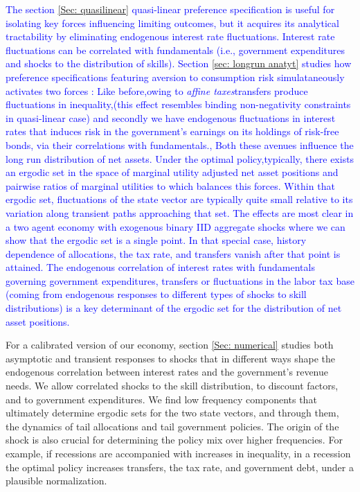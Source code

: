 \documentclass[thmsb,11pt]{article}
\begin{document}
\textcolor{blue}{The section \ref{Sec: quasilinear} quasi-linear preference specification is useful for isolating key forces influencing
limiting outcomes, but it acquires its analytical tractability by eliminating endogenous interest rate fluctuations.
Interest rate fluctuations can be correlated with fundamentals (i.e., government expenditures and shocks to the distribution
of skills). Section \ref{sec: longrun anatyt} studies how preference specifications
featuring aversion to consumption risk simulataneously activates two forces : Like before,owing to \emph{affine taxes}transfers produce fluctuations in inequality,(this effect resembles binding non-negativity constraints in quasi-linear case) and secondly we have endogenous fluctuations in interest rates that induces risk in the government's earnings on its holdings of risk-free bonds, via their correlations with fundamentals., Both these avenues influence the long run distribution of net assets. Under the optimal policy,typically, there exists an ergodic set in the space of marginal utility adjusted net asset positions and pairwise ratios of marginal utilities to which balances this forces. Within that ergodic set, fluctuations of the state vector are typically quite small relative to its variation along transient paths approaching that set. The effects are most clear in a two agent economy with exogenous binary IID aggregate shocks where we can show that the ergodic set is a single point. In that special case, history dependence
of allocations, the tax rate, and transfers vanish after that point is attained. The endogenous correlation of interest rates with fundamentals governing government
expenditures, transfers or fluctuations in the labor tax base (coming from endogenous responses to different types of shocks to skill distributions) is a key determinant of the ergodic set for the distribution of net asset positions.}

 For a calibrated version of our economy, section \ref{Sec: numerical} studies both asymptotic and transient responses to shocks
 that    in different ways shape the endogenous correlation between interest rates and the government's revenue needs.  We allow correlated shocks
 to the skill distribution, to discount factors, and to government expenditures.
We find  low frequency components that ultimately determine  ergodic sets for the two state vectors, and through them, the dynamics of tail allocations and tail government policies.  The origin of the shock is also crucial for determining the policy mix over higher frequencies. For example, if recessions are accompanied with increases in inequality, in a recession the optimal policy increases  transfers, the tax rate, and   government debt, under a plausible
normalization.
\end{document}
